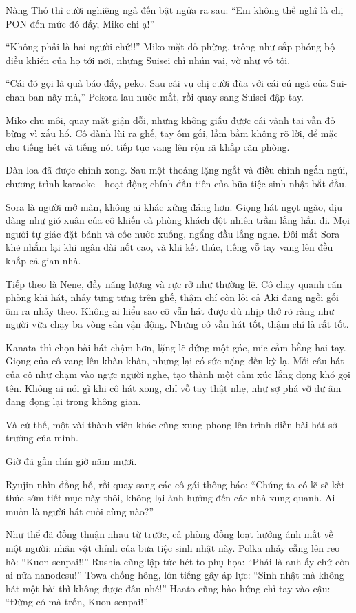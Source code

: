 \documentclass[../main.tex]{subfiles}
\begin{document}
Nàng Thỏ thì cười nghiêng ngả đến bật ngửa ra sau: ``Em không thể nghĩ là chị PON đến mức đó đấy, Miko-chi ạ!''

``Không phải là hai người chứ!!'' Miko mặt đỏ phừng, trông như sắp phóng bộ điều khiển của họ tới nơi, nhưng Suisei chỉ nhún vai, vờ như vô tội.

``Cái đó gọi là quả báo đấy, peko. Sau cái vụ chị cười đùa với cái cú ngã của Sui-chan ban nãy mà,'' Pekora lau nước mắt, rồi quay sang Suisei đập tay.

Miko chu môi, quay mặt giận dỗi, nhưng không giấu được cái vành tai vẫn đỏ bừng vì xấu hổ. Cô đành lùi ra ghế, tay ôm gối, lầm bầm không rõ lời, để mặc cho tiếng hét và tiếng nói tiếp tục vang lên rộn rã khắp căn phòng.

\ct

Dàn loa đã được chỉnh xong. Sau một thoáng lặng ngắt và điều chỉnh ngắn ngủi, chương trình karaoke - hoạt động chính đầu tiên của bữa tiệc sinh nhật bắt đầu.

Sora là người mở màn, không ai khác xứng đáng hơn. Giọng hát ngọt ngào, dịu dàng như gió xuân của cô khiến cả phòng khách đột nhiên trầm lắng hẳn đi. Mọi người tự giác đặt bánh và cốc nước xuống, ngẩng đầu lắng nghe. Đôi mắt Sora khẽ nhắm lại khi ngân dài nốt cao, và khi kết thúc, tiếng vỗ tay vang lên đều khắp cả gian nhà.

Tiếp theo là Nene, đầy năng lượng và rực rỡ như thường lệ. Cô chạy quanh căn phòng khi hát, nhảy tưng tưng trên ghế, thậm chí còn lôi cả Aki đang ngồi gối ôm ra nhảy theo. Không ai hiểu sao cô vẫn hát được dù nhịp thở rõ ràng như người vừa chạy ba vòng sân vận động. Nhưng cô vẫn hát tốt, thậm chí là rất tốt.

Kanata thì chọn bài hát chậm hơn, lặng lẽ đứng một góc, mic cầm bằng hai tay. Giọng của cô vang lên khàn khàn, nhưng lại có sức nặng đến kỳ lạ. Mỗi câu hát của cô như chạm vào ngực người nghe, tạo thành một cảm xúc lắng đọng khó gọi tên. Không ai nói gì khi cô hát xong, chỉ vỗ tay thật nhẹ, như sợ phá vỡ dư âm đang đọng lại trong không gian.

Và cứ thế, một vài thành viên khác cũng xung phong lên trình diễn bài hát sở trường của mình.

Giờ đã gần chín giờ năm mươi.

Ryujin nhìn đồng hồ, rồi quay sang các cô gái thông báo: ``Chúng ta có lẽ sẽ kết thúc sớm tiết mục này thôi, không lại ảnh hưởng đến các nhà xung quanh. Ai muốn là người hát cuối cùng nào?''

Như thể đã đồng thuận nhau từ trước, cả phòng đồng loạt hướng ánh mắt về một người: nhân vật chính của bữa tiệc sinh nhật này. Polka nhảy cẫng lên reo hò: ``Kuon-senpai!!'' Rushia cũng lập tức hét to phụ họa: ``Phải là anh ấy chứ còn ai nữa-nanodesu!'' Towa chống hông, lớn tiếng gây áp lực: ``Sinh nhật mà không hát một bài thì không được đâu nhé!'' Haato cũng hào hứng chỉ tay vào cậu: ``Đừng có mà trốn, Kuon-senpai!''
\end{document}
